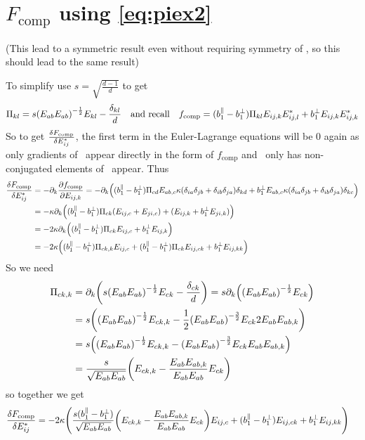 \documentclass[11pt]{article}
\begin{document}
\pagebreak
\section{$F_\text{comp}$ using \cref{eq:piex2}}
(This lead to a symmetric result even without requiring symmetry of \EE, so this should lead to the same result)

To simplify use $s=\sqrt{\frac{d-1}{d}}$ to get
\begin{equation}
    \Pi_{kl} = s \qty(E_{ab}E_{ab})^{-\frac{1}{2}}E_{kl} - \frac{\delta_{kl}}{d} \qq{and recall} f_\text{comp} = (b_1^\parallel - b_1^\perp) \Pi_{kl} E_{ij,k}E_{ij,l}^* + b_1^\perp E_{ij,k}E_{ij,k}^*
\end{equation}
So to get $\fdv{F_\text{comp}}{E_{ij}^*}$, the first term in the Euler-Lagrange equations will be 0 again as only gradients of \EE\ appear directly in the form of $f_\text{comp}$ and \PP\ only has non-conjugated elements of \EE\ appear.
Thus
\begin{align}
    \fdv{F_\text{comp}}{E_{ij}^*} &= -\pp_k \pdv{f_\text{comp}}{E_{ij,k}} = -\pp_k \qty((b_1^\parallel - b_1^\perp) \Pi_{cd} E_{ab,c} \kappa(\ddelta{i}{j}{a}{b})\delta_{kd} + b_1^\perp E_{ab,c}\kappa(\ddelta{i}{j}{a}{b})\delta_{kc}) \\
    &= -\kappa\pp_k \qty((b_1^\parallel - b_1^\perp) \Pi_{ck} (E_{ij,c} + E_{ji,c}) + (E_{ij,k} + b_1^\perp E_{ji,k})) \\
    &= -2\kappa\pp_k \qty((b_1^\parallel - b_1^\perp) \Pi_{ck} E_{ij,c} + b_1^\perp E_{ij,k}) \\
    &= -2\kappa\qty((b_1^\parallel - b_1^\perp) \Pi_{ck,k} E_{ij,c} + (b_1^\parallel - b_1^\perp) \Pi_{ck} E_{ij,ck} + b_1^\perp E_{ij,kk})
\end{align}
So we need
\begin{align}
    \Pi_{ck,k} &= \partial_k \qty( s \qty(E_{ab}E_{ab})^{-\frac{1}{2}}E_{ck} - \frac{\delta_{ck}}{d}) = s \partial_k \qty( \qty(E_{ab}E_{ab})^{-\frac{1}{2}}E_{ck}) \\
    &= s \qty(\qty(E_{ab}E_{ab})^{-\frac{1}{2}}E_{ck,k} - \frac{1}{2}\qty(E_{ab}E_{ab})^{-\frac{3}{2}}E_{ck}2E_{ab}E_{ab,k}) \\
    &= s \qty(\qty(E_{ab}E_{ab})^{-\frac{1}{2}}E_{ck,k} - \qty(E_{ab}E_{ab})^{-\frac{3}{2}}E_{ck}E_{ab}E_{ab,k}) \\
    &= \frac{s}{\sqrt{E_{ab}E_{ab}}} \qty(E_{ck,k} - \frac{E_{ab}E_{ab,k}}{E_{ab}E_{ab}}E_{ck})
\end{align}
so together we get
\begin{align}
    \fdv{F_\text{comp}}{E_{ij}^*} &= -2\kappa\qty(\frac{s(b_1^\parallel - b_1^\perp)}{\sqrt{E_{ab}E_{ab}}} \qty(E_{ck,k} - \frac{E_{ab}E_{ab,k}}{E_{ab}E_{ab}}E_{ck}) E_{ij,c} + (b_1^\parallel - b_1^\perp) E_{ij,ck} + b_1^\perp E_{ij,kk})
\end{align}
\end{document}
